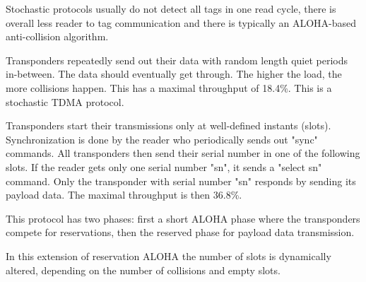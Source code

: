 \begin{mytitle} Stochastic protocols usually do not detect all tags in one read cycle, there is overall less reader to tag communication and there is typically an ALOHA-based anti-collision algorithm.
    \begin{mysubtitle} Transponders repeatedly send out their data with random length quiet periods in-between. The data should eventually get through. The higher the load, the more collisions happen. This has a maximal throughput of 18.4\%. This is a stochastic TDMA protocol.
    \end{mysubtitle}
    \begin{mysubtitle} Transponders start their transmissions only at well-defined instants (slots). Synchronization is done by the reader who periodically sends out "sync" commands. All transponders then send their serial number in one of the following slots. If the reader gets only one serial number "sn", it sends a "select sn" command. Only the transponder with serial number "sn" responds by sending its payload data. The maximal throughput is then 36.8\%. 
    \end{mysubtitle}
    \begin{mysubtitle} This protocol has two phases: first a short ALOHA phase where the transponders compete for reservations, then the reserved phase for payload data transmission. 
    \end{mysubtitle}
    \begin{mysubtitle} In this extension of reservation ALOHA the number of slots is dynamically altered, depending on the number of collisions and empty slots.
    \end{mysubtitle}
\end{mytitle}

